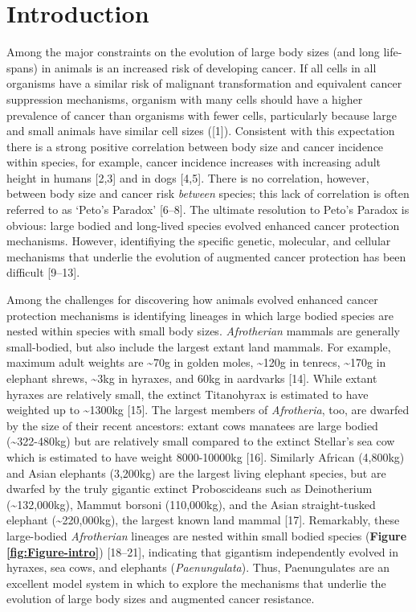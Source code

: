 \documentclass[]{elsarticle} %
\begin{document}
\hypertarget{introduction}{%
\section{Introduction}\label{introduction}}

Among the major constraints on the evolution of large body sizes (and long life-spans) in animals is an increased risk of developing cancer. If all cells in all organisms have a similar risk of malignant transformation and equivalent cancer suppression mechanisms, organism with many cells should have a higher prevalence of cancer than organisms with fewer cells, particularly because large and small animals have similar cell sizes ({[}1{]}). Consistent with this expectation there is a strong positive correlation between body size and cancer incidence within species, for example, cancer incidence increases with increasing adult height in humans {[}2,3{]} and in dogs {[}4,5{]}. There is no correlation, however, between body size and cancer risk \emph{between} species; this lack of correlation is often referred to as `Peto's Paradox' {[}6--8{]}. The ultimate resolution to Peto's Paradox is obvious: large bodied and long-lived species evolved enhanced cancer protection mechanisms. However, identifiying the specific genetic, molecular, and cellular mechanisms that underlie the evolution of augmented cancer protection has been difficult {[}9--13{]}.

Among the challenges for discovering how animals evolved enhanced cancer protection mechanisms is identifying lineages in which large bodied species are nested within species with small body sizes. \emph{Afrotherian} mammals are generally small-bodied, but also include the largest extant land mammals. For example, maximum adult weights are \textasciitilde{}70g in golden moles, \textasciitilde{}120g in tenrecs, \textasciitilde{}170g in elephant shrews, \textasciitilde{}3kg in hyraxes, and 60kg in aardvarks {[}14{]}. While extant hyraxes are relatively small, the extinct Titanohyrax is estimated to have weighted up to \textasciitilde{}1300kg {[}15{]}. The largest members of \emph{Afrotheria}, too, are dwarfed by the size of their recent ancestors: extant cows manatees are large bodied (\textasciitilde{}322-480kg) but are relatively small compared to the extinct Stellar's sea cow which is estimated to have weight 8000-10000kg {[}16{]}. Similarly African (4,800kg) and Asian elephants (3,200kg) are the largest living elephant species, but are dwarfed by the truly gigantic extinct Proboscideans such as Deinotherium (\textasciitilde{}132,000kg), Mammut borsoni (110,000kg), and the Asian straight-tusked elephant (\textasciitilde{}220,000kg), the largest known land mammal {[}17{]}. Remarkably, these large-bodied \emph{Afrotherian} lineages are nested within small bodied species (\textbf{Figure \ref{fig:Figure-intro}}) {[}18--21{]}, indicating that gigantism independently evolved in hyraxes, sea cows, and elephants (\emph{Paenungulata}). Thus, Paenungulates are an excellent model system in which to explore the mechanisms that underlie the evolution of large body sizes and augmented cancer resistance.
\end{document}
